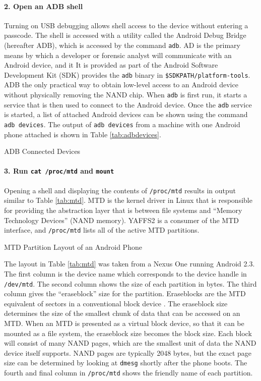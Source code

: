 \paragraph {2. Open an ADB shell}
Turning on USB debugging allows shell access to the device without entering a passcode. The shell is accessed with a utility called
the Android Debug Bridge (hereafter ADB), which is accessed by the command \texttt{adb}.  AD is the primary means by which a
developer or forensic analyst will communicate with an Android device, and it It is provided as part of the Android Software
Development Kit (SDK) provides the \texttt{adb} binary in \texttt{\$SDKPATH/platform-tools}.  ADB the only practical way to obtain
low-level access to an Android device without physically removing the NAND chip.  When \texttt{adb} is first run, it starts a
service that is then used to connect to the Android device.  Once the \texttt{adb} service is started, a list of attached Android
devices can be shown using the command \texttt{adb devices}.  The output of \texttt{adb devices} from a machine with one Android
phone attached is shown in Table \ref{tab:adbdevices}.

\begin{table}[htb]
\lstset{numbers=none}

\caption{ADB Connected Devices}
\label{tab:adbdevices}
\end{table}

\paragraph {3. Run \texttt{cat /proc/mtd} and \texttt{mount}}
Opening a shell and displaying the contents of \texttt{/proc/mtd} results in output similar to Table \ref{tab:mtd}.  MTD is the
kernel driver in Linux that is responsible for providing the abstraction layer that is between file systems and ``Memory
Technology Devices'' (NAND memory). YAFFS2 is a consumer of the MTD interface, and \texttt{/proc/mtd} lists all of the active MTD
partitions. 
\begin{table}[htb]
\lstset{numbers=none}

\caption{MTD Partition Layout of an Android Phone}
\label{tab:mtd}
\end{table}	

The layout in Table \ref{tab:mtd} was taken from a Nexus One running Android 2.3.  The first column is the device name which corresponds to the device
handle in \texttt{/dev/mtd}.  The second column shows the size of each partition in bytes.  The third column gives the
``eraseblock'' size for the partition.  Eraseblocks are the MTD equivalent of sectors in a conventional block device \cite{mtdfaq}.
The eraseblock size determines the size of the smallest chunk of data that can be accessed on an MTD.  When an MTD is presented as a
virtual block device, so that it can be mounted as a file system, the eraseblock size becomes the block size.  Each block will
consist of many NAND pages, which are the smallest unit of data the NAND device itself supports.  NAND pages are typically 2048
bytes, but the exact page size can be determined by looking at \texttt{dmesg} shortly after the phone boots.  The fourth and final
column in \texttt{/proc/mtd} shows the friendly name of each partition.  

